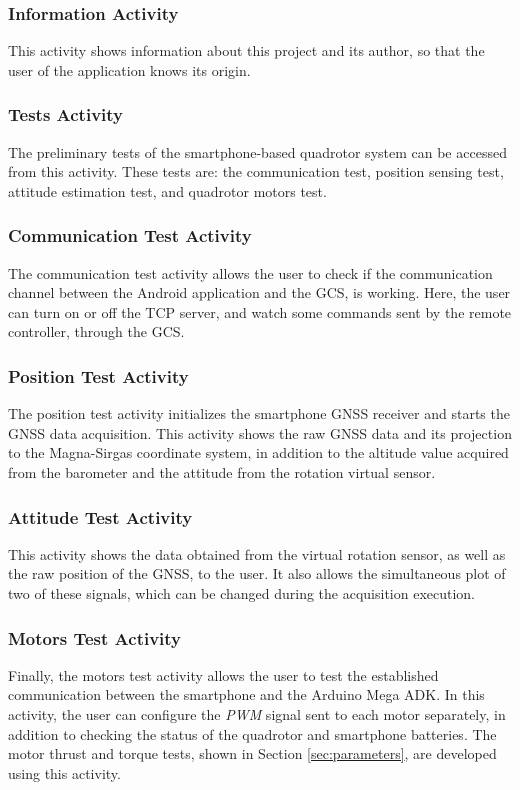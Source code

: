 \subsubsection{Information Activity}
This activity shows information about this project and its author, so that the user of the application knows its origin.

\subsubsection{Tests Activity}
The preliminary tests of the smartphone-based quadrotor system can be accessed from this activity. These tests are: the communication test, position sensing test, attitude estimation test, and quadrotor motors test.

\subsubsection{Communication Test Activity}
The communication test activity allows the user to check if the communication channel between the Android application and the GCS, is working. Here, the user can turn on or off the TCP server, and watch some commands sent by the remote controller, through the GCS. 

\subsubsection{Position Test Activity}
The position test activity initializes the smartphone GNSS receiver and starts the GNSS data acquisition. This activity shows the raw GNSS data and its projection to the Magna-Sirgas coordinate system, in addition to the altitude value acquired from the barometer and the attitude from the rotation virtual sensor.

\subsubsection{Attitude Test Activity}
This activity shows the data obtained from the virtual rotation sensor, as well as the raw position of the GNSS, to the user. It also allows the simultaneous plot of two of these signals, which can be changed during the acquisition execution.

\subsubsection{Motors Test Activity}
Finally, the motors test activity allows the user to test the established communication between the smartphone and the Arduino Mega ADK. In this activity, the user can configure the \textit{PWM} signal sent to each motor separately, in addition to checking the status of the quadrotor and smartphone batteries. The motor thrust and torque tests, shown in Section \ref{sec:parameters}, are developed using this activity.

